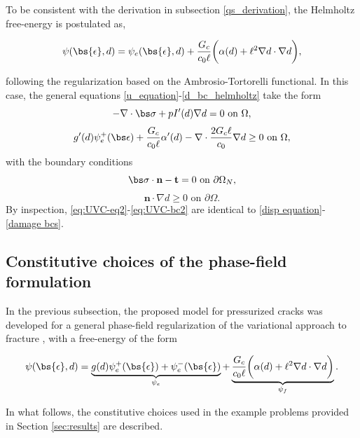 \noindent To be consistent with the derivation in subsection \ref{qs_derivation}, the Helmholtz free-energy is postulated as,

\begin{equation}\label{helmholtz free-energy postulate}
    \psi(\bs{\epsilon},d) = \psi_e(\bs{\epsilon},d) + \dfrac{G_c}{c_0\ell}\bigg( \alpha(d) + \ell^2\nabla d \cdot \nabla d\bigg),
\end{equation}

\noindent following the regularization based on the Ambrosio-Tortorelli functional. In this case, the general equations \eqref{u_equation}-\eqref{d_bc_helmholtz} take the form
\begin{equation}
\label{eq:UVC-eq2}
    -\nabla \cdot \bs\sigma  + pI'(d) \nabla d = 0 \text{ on }\Omega,
\end{equation}
\begin{equation}
    g'(d) \psi_e^+(\bs\epsilon)
    + \dfrac{G_c}{c_0\ell}\alpha'(d) - \nabla \cdot \dfrac{2G_c\ell}{c_0}\nabla d \ge 0 \text{ on }\Omega,
\end{equation}
 with the boundary conditions
\begin{equation}
    \bs\sigma\cdot \textbf{n}-\textbf{t} = 0 \text{ on }\partial\Omega_N,
\end{equation}
\begin{equation}
\label{eq:UVC-bc2}
    \textbf{n}\cdot \nabla d \ge 0 \text{ on }\partial\Omega.
\end{equation}
By inspection, \eqref{eq:UVC-eq2}-\eqref{eq:UVC-bc2} are identical to \eqref{disp equation}-\eqref{damage bcs}.

\subsection{Constitutive choices of the phase-field formulation}

In the previous subsection, the proposed model for pressurized cracks was developed for a general phase-field regularization of the variational approach to fracture \cite{francfort1998revisiting}, with a free-energy of the form

\begin{equation}\label{PF general form}
    \psi(\bs{\epsilon},d) = \underbrace{g(d)\psi_e^+(\bs{\epsilon}) + \psi_e^-(\bs{\epsilon})}_{\psi_e} + \underbrace{\frac{G_c}{c_0\ell}\bigg( \alpha(d) + \ell^2\nabla d \cdot \nabla d\bigg)}_{\psi_f}.
\end{equation}

\noindent In what follows, the constitutive choices used in the example problems provided in Section \ref{sec:results} are described. 

